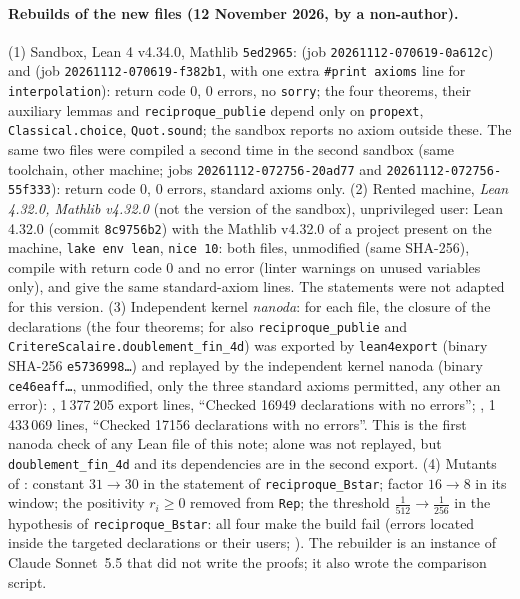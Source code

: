 \documentclass[11pt,a4paper]{article}
\theoremstyle{plain}
\theoremstyle{definition}
\theoremstyle{remark}
\numberwithin{equation}{section}
\begin{document}
\paragraph{Rebuilds of the new files (12 November 2026, by a non-author).} (1) Sandbox, Lean 4 v4.34.0, Mathlib \texttt{5ed2965}:  (job \texttt{20261112-070619-0a612c}) and  (job \texttt{20261112-070619-f382b1}, with one extra \texttt{\#print axioms} line for \texttt{interpolation}): return code $0$, $0$ errors, no \texttt{sorry}; the four theorems, their auxiliary lemmas and \texttt{reciproque\_publie} depend only on \texttt{propext}, \texttt{Classical.choice}, \texttt{Quot.sound}; the sandbox reports no axiom outside these. The same two files were compiled a second time in the second sandbox (same toolchain, other machine; jobs \texttt{20261112-072756-20ad77} and \texttt{20261112-072756-55f333}): return code $0$, $0$ errors, standard axioms only. (2) Rented machine, \emph{Lean 4.32.0, Mathlib v4.32.0} (not the version of the sandbox), unprivileged user: Lean 4.32.0 (commit \texttt{8c9756b2}) with the Mathlib v4.32.0 of a project present on the machine, \texttt{lake env lean}, \texttt{nice 10}: both files, unmodified (same SHA-256), compile with return code $0$ and no error (linter warnings on unused variables only), and give the same standard-axiom lines. The statements were not adapted for this version. (3) Independent kernel \emph{nanoda}: for each file, the closure of the declarations (the four theorems; for  also \texttt{reciproque\_publie} and \texttt{CritereScalaire.doublement\_fin\_4d}) was exported by \texttt{lean4export} (binary SHA-256 \texttt{e5736998\dots}) and replayed by the independent kernel nanoda (binary \texttt{ce46eaff\dots}, unmodified, only the three standard axioms permitted, any other an error): , 1\,377\,205 export lines, ``Checked 16949 declarations with no errors''; , 1\,433\,069 lines, ``Checked 17156 declarations with no errors''. This is the first nanoda check of any Lean file of this note;  alone was not replayed, but \texttt{doublement\_fin\_4d} and its dependencies are in the second export. (4) Mutants of : constant $31\to30$ in the statement of \texttt{reciproque\_Bstar}; factor $16\to8$ in its window; the positivity $r_i\ge0$ removed from \texttt{Rep}; the threshold $\frac1{512}\to\frac1{256}$ in the hypothesis of \texttt{reciproque\_Bstar}: all four make the build fail (errors located inside the targeted declarations or their users; ). The rebuilder is an instance of Claude Sonnet~5.5 that did not write the proofs; it also wrote the comparison script.
\end{document}
